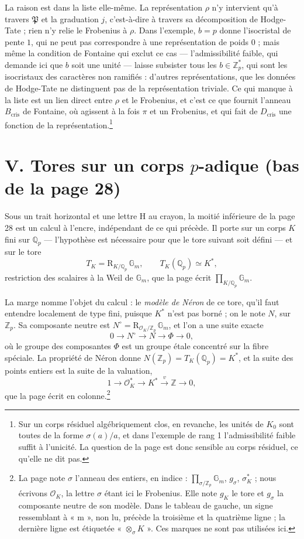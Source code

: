 \documentclass[11pt,a4paper]{article}
\begin{document}
La raison est dans la liste elle-même. La représentation $\rho$ n'y intervient
qu'à travers $\mathfrak{P}$ et la graduation $j$, c'est-à-dire à travers sa
décomposition de Hodge-Tate ; rien n'y relie le Frobenius à $\rho$. Dans
l'exemple, $b = p$ donne l'isocristal de pente $1$, qui ne peut pas
correspondre à une représentation de poids $0$ ; mais même la condition de
Fontaine qui exclut ce cas --- l'admissibilité faible, qui demande ici que $b$
soit une unité --- laisse subsister tous les $b \in \mathbb{Z}_p^{*}$, qui
sont les isocristaux des caractères non ramifiés : d'autres représentations,
que les données de Hodge-Tate ne distinguent pas de la représentation
triviale. Ce qui manque à la liste est un lien direct entre $\rho$ et le
Frobenius, et c'est ce que fournit l'anneau $B_{\mathrm{cris}}$ de Fontaine,
où agissent à la fois $\pi$ et un Frobenius, et qui fait de
$D_{\mathrm{cris}}$ une fonction de la représentation.\footnote{Sur un corps
résiduel algébriquement clos, en revanche, les unités de $K_0$ sont toutes de
la forme $\sigma(a)/a$, et dans l'exemple de rang 1 l'admissibilité faible
suffit à l'unicité. La question de la page est donc sensible au corps
résiduel, ce qu'elle ne dit pas.}

\section*{V. Tores sur un corps $p$-adique (bas de la page 28)}

Sous un trait horizontal et une lettre H au crayon, la moitié inférieure de la
page 28 est un calcul à l'encre, indépendant de ce qui précède. Il porte sur un
corps $K$ fini sur $\mathbb{Q}_p$ --- l'hypothèse est nécessaire pour que le
tore suivant soit défini --- et sur le tore
\[
T_K = \mathrm{R}_{K/\mathbb{Q}_p}\, \mathbb{G}_m, \qquad
T_K(\mathbb{Q}_p) \simeq K^{*},
\]
restriction des scalaires à la Weil de $\mathbb{G}_m$, que la page écrit
$\prod_{K/\mathbb{Q}_p} \mathbb{G}_m$.

La marge nomme l'objet du calcul : le \emph{modèle de Néron} de ce tore,
qu'il faut entendre localement de type fini, puisque $K^{*}$ n'est pas
borné ; on le note $N$, sur $\mathbb{Z}_p$. Sa
composante neutre est $N^{\circ} = \mathrm{R}_{\mathcal{O}_K/\mathbb{Z}_p}\,
\mathbb{G}_m$, et l'on a une suite exacte
\[
0 \longrightarrow N^{\circ} \longrightarrow N \longrightarrow \Phi
\longrightarrow 0,
\]
où le groupe des composantes $\Phi$ est un groupe étale concentré sur la fibre
spéciale. La propriété de Néron donne $N(\mathbb{Z}_p) = T_K(\mathbb{Q}_p) =
K^{*}$, et la suite des points entiers est la suite de la valuation,
\[
1 \longrightarrow \mathcal{O}_K^{*} \longrightarrow K^{*}
\xrightarrow{\ v\ } \mathbb{Z} \longrightarrow 0,
\]
que la page écrit en colonne.\footnote{La page note $\sigma$ l'anneau des
entiers, en indice : $\prod_{\sigma/\mathbb{Z}_p}\mathbb{G}_m$,
$g_{\sigma}$, $\sigma^{*}_K$ ; nous écrivons $\mathcal{O}_K$, la lettre
$\sigma$ étant ici le Frobenius. Elle note $g_K$ le tore et $g_{\sigma}$ la
composante neutre de son modèle. Dans le tableau de gauche, un signe
ressemblant à « m », non lu, précède la troisième et la quatrième ligne ; la
dernière ligne est étiquetée « $\otimes_{\sigma} K$ ». Ces marques ne sont pas
utilisées ici.}
\end{document}
